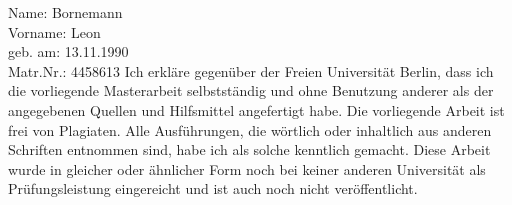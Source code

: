 
\begin{declaration}

Name: Bornemann \\
Vorname: Leon \\
geb. am: 13.11.1990\\
Matr.Nr.: 4458613\newline \newline
Ich erkläre gegenüber der Freien Universität Berlin, dass ich die vorliegende Masterarbeit selbstständig und ohne Benutzung anderer als der angegebenen Quellen und Hilfsmittel angefertigt habe. Die vorliegende Arbeit ist frei von Plagiaten. Alle Ausführungen, die wörtlich oder inhaltlich aus anderen Schriften entnommen sind, habe ich als solche kenntlich gemacht. Diese Arbeit wurde in gleicher oder ähnlicher Form noch bei keiner anderen Universität als Prüfungsleistung eingereicht und ist auch noch nicht veröffentlicht.


\end{declaration}

